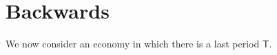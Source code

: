 \documentclass[\econtexRoot/BufferStockTheory.tex]{subfiles}
\begin{document}
\begin{comment}

  \begin{equation}\begin{gathered}\begin{aligned}
         & = \left(\frac{1}{2}\right)\left(\erf(\Top{\SetPartCnts}_{\thisBin}-\Bot{\SetPartCnts}_{\thisBin})-\erf(\Bot{\SetPartCnts}_{\thisBin}-\Bot{\SetPartCnts}_{\thisBin})\right)
  \end{aligned}\end{gathered}\end{equation}
\end{comment}

\begin{comment}
  Finally, for $a < b$ defining 
  \begin{equation}\begin{gathered}\begin{aligned}
    \mathfrak{C}(a,b) & \equiv  \CDF^{\tShk}(b)-\CDF^{\tShk}(a)
  \end{aligned}\end{gathered}\end{equation}

  so
  \begin{equation}\begin{gathered}\begin{aligned}
    \TnsMrkv_{\thisBin,\thatBin} &= \int_{\Bot{\SetPartCnts}_{\thisBin}}^{\Top{\SetPartCnts}_{\thisBin}} \mathfrak{C}(\pnt-\underline{\pnt}_{\thatBin},\pnt-\bar{\pnt}_{\thatBin})d\CDF^{\pnt}
  \end{aligned}\end{gathered}\end{equation}
\end{comment}

\section{Backwards}

\newcommand{\last}{\mathsf{T}}
We now consider an economy in which there is a last period $\last$.
\end{document}
